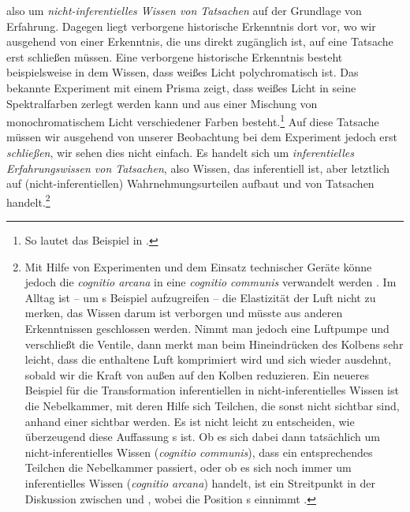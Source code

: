 also um \emph{nicht-inferentielles Wissen von Tatsachen} auf der Grundlage von
Erfahrung. Dagegen liegt verborgene historische Erkenntnis dort vor, wo wir
ausgehend von einer Erkenntnis, die uns direkt zugänglich ist, auf eine Tatsache
erst schließen müssen. Eine verborgene historische Erkenntnis besteht
beispielsweise in dem Wissen, dass weißes Licht polychromatisch ist. Das
bekannte Experiment mit einem Prisma zeigt, dass weißes Licht in seine
Spektralfarben zerlegt werden kann und aus einer Mischung von monochromatischem
Licht verschiedener Farben besteht.\footnote{So lautet das Beispiel in
\cite[][\S~20]{Wolff:Discursuspraeliminarisdephilosophiaingenere1996}.} Auf
diese Tatsache müssen wir ausgehend von unserer Beobachtung bei dem Experiment
jedoch erst \emph{schließen}, wir sehen dies nicht einfach. Es handelt sich um
\emph{inferentielles Erfahrungswissen von Tatsachen}, also Wissen, das
inferentiell ist, aber letztlich auf (nicht-inferentiellen) Wahrnehmungsurteilen
aufbaut und von Tatsachen
handelt.\footnote{\label{Anmerkung:CognitioArcanaCognitioCommunis}
Mit Hilfe von Experimenten und dem Einsatz technischer Geräte könne jedoch die \emph{cognitio arcana} in eine \emph{cognitio communis} verwandelt werden \parencite[vgl.][\S~24]{Wolff:Discursuspraeliminarisdephilosophiaingenere1996}.
Im Alltag ist -- um
s Beispiel
aufzugreifen -- die Elastizität der Luft nicht zu merken, das Wissen darum ist
verborgen und müsste aus anderen Erkenntnissen geschlossen werden.
Nimmt man jedoch eine Luftpumpe und verschließt die Ventile, dann merkt man beim Hineindrücken
des Kolbens sehr leicht, dass die enthaltene Luft komprimiert wird und sich
wieder ausdehnt, sobald wir die Kraft von außen auf den Kolben reduzieren. Ein
neueres Beispiel für die Transformation inferentiellen in nicht-inferentielles
Wissen ist die Nebelkammer, mit deren Hilfe sich Teilchen, die sonst nicht
sichtbar sind, anhand einer  sichtbar werden. Es ist
nicht leicht zu entscheiden, wie überzeugend diese Auffassung
s ist. Ob es
sich dabei dann tatsächlich um nicht-inferentielles Wissen (\emph{cognitio
communis}), dass ein entsprechendes Teilchen die Nebelkammer passiert, oder ob
es sich noch immer um inferentielles Wissen (\emph{cognitio arcana}) handelt,
ist ein Streitpunkt in der Diskussion zwischen
 und
, wobei
 die Position
s einnimmt
\parencite[vgl.][141]{McDowell:BrandomonObservation2010}.}


